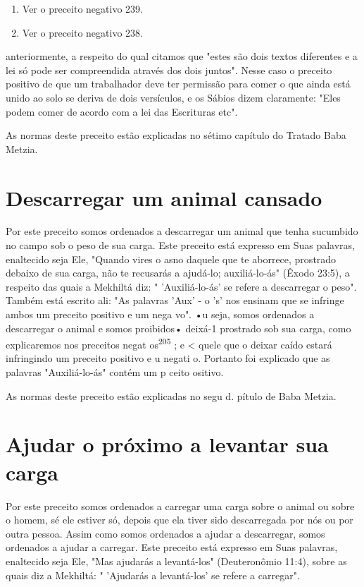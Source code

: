 \begin{itemize}
\begin{enumrate}
\begin{itemize}
\begin{itemize}
\begin{itemize}
\begin{enumerate}
\def\labelenumi{\arabic{enumi}.}
\setcounter{enumi}{202}
\item
 
 Ver o preceito negativo 239.
 
\item
 
 Ver o preceito negativo 238.
 
\end{enumerate}

anteriormente, a respeito do qual citamos que "estes são dois textos
diferentes e a lei só pode ser compreendida através dos dois juntos".
Nesse caso o precei­to positivo de que um trabalhador deve ter permissão
para comer o que ainda está unido ao solo se deriva de dois versículos,
e os Sábios dizem claramente: "Eles podem comer de acordo com a lei das
Escrituras etc".

As normas deste preceito estão explicadas no sétimo capítulo do Tra­tado
Baba Metzia.

\section{Descarregar um animal cansado}

Por este preceito somos ordenados a descarregar um animal que te­nha
sucumbido no campo sob o peso de sua carga. Este preceito está expresso
em Suas palavras, enaltecido seja Ele, "Quando vires o asno daquele que
te abor­rece, prostrado debaixo de sua carga, não te recusarás a
ajudá-lo; auxiliá-lo-ás" (Êxodo 23:5), a respeito das quais a Mekhiltá
diz: " 'Auxiliá-lo-ás' se refere a descarregar o peso". Também está
escrito ali: "As palavras 'Aux' - o 's' nos ensinam que se infringe
ambos um preceito positivo e um nega vo". •u seja, somos ordenados a
descarregar o animal e somos proibidos• deixá-1 pros­trado sob sua
carga, como explicaremos nos preceitos negat os\textsuperscript{205} ; e
\textless{} quele que o deixar caído estará infringindo um preceito
positivo e u negati o. Por­tanto foi explicado que as palavras
"Auxiliá-lo-ás" contém um p ceito ositivo.

As normas deste preceito estão explicadas no segu d. pítulo de Baba
Metzia.

\section{Ajudar o próximo a levantar sua carga}

Por este preceito somos ordenados a carregar uma carga sobre o ani­mal
ou sobre o homem, sé ele estiver só, depois que ela tiver sido
descarregada por nós ou por outra pessoa. Assim como somos ordenados a
ajudar a descar­regar, somos ordenados a ajudar a carregar. Este
preceito está expresso em Suas palavras, enaltecido seja Ele, "Mas
ajudarás a levantá-los" (Deuteronômio 11:4), sobre as quais diz a
Mekhiltá: " 'Ajudarás a levantá-los' se refere a carregar".


\end{itemize}
\end{itemize}
\end{itemize}
\end{enumrate}
\end{itemize}
